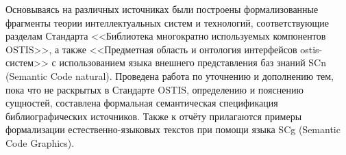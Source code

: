 
Основываясь на различных источниках были построены формализованные фрагменты теории интеллектуальных систем и технологий, соответствующие разделам Стандарта <<Библиотека многократно используемых компонентов OSTIS>>, а также <<Предметная область и онтология интерфейсов ostis-систем>> с использованием языка внешнего представления баз знаний SCn (Semantic Code natural). Проведена работа по уточнению и дополнению тем, пока что не раскрытых в Стандарте OSTIS, определению и пояснению сущностей, составлена формальная семантическая спецификация библиографических источников. Также к отчёту прилагаются примеры формализации естественно-языковых текстов при помощи языка SCg (Semantic Code Graphics).